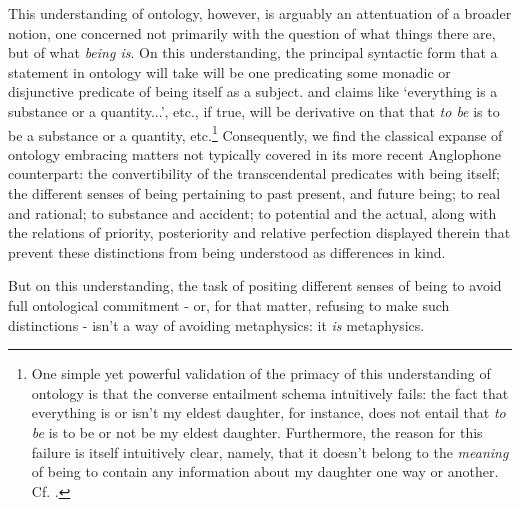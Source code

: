 \documentclass[]{article}
\begin{document}
This understanding of ontology, 
however, 
is arguably 
an attentuation of a broader notion,
one concerned not primarily with the question of what things there are, but of what \emph{being is}. 
On this understanding, 
the principal syntactic form that a statement in ontology will take will be one predicating some monadic or disjunctive predicate of being itself as a subject. 
and claims like `everything is a substance or a quantity...', etc., 
if true, 
will be derivative on that that \emph{to be} is to be a substance or a quantity, etc.\footnote{
One simple yet powerful validation of the primacy of this understanding of ontology is that the converse entailment schema intuitively fails: 
the fact that everything is or isn't my eldest daughter, for instance, 
does not entail that \emph{to be} is to be or not be my eldest daughter. 
Furthermore, the reason for this failure is itself intuitively clear, 
namely, 
that it doesn't belong to the \emph{meaning} of being to contain any information about my daughter one way or another. Cf. \autocite{Fine1994}.}
Consequently, we find the classical expanse of ontology embracing matters not typically covered in its more recent Anglophone counterpart: 
the convertibility of the transcendental predicates with being itself;  
the different senses of being pertaining 
to past present, and future being;
to real and rational;
to substance and accident; 
to potential and the actual, 
along with the relations of priority, posteriority and relative perfection displayed therein
that prevent these distinctions from being understood as differences in kind. 

But on this understanding, the task of positing different senses of being to avoid full ontological commitment - 
or, for that matter, refusing to make such distinctions - 
isn't a way of avoiding metaphysics: it \emph{is} metaphysics.
\end{document}
